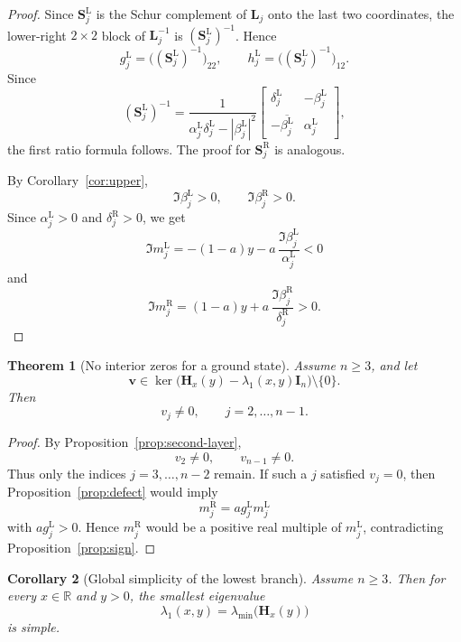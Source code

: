 \documentclass[11pt]{article}
\numberwithin{equation}{section}
\newtheorem{theorem}{Theorem}[section]
\newtheorem{corollary}[theorem]{Corollary}
\newcommand{\R}{\mathbb R}
\newcommand{\I}{\mathbf I}
\newcommand{\Hmat}{\mathbf H}
\begin{document}
\begin{proof}
Since \(\mathbf S_j^{\mathrm L}\) is the Schur complement of \(\mathbf L_j\) onto the last
two coordinates, the lower-right \(2\times2\) block of \(\mathbf L_j^{-1}\) is
\((\mathbf S_j^{\mathrm L})^{-1}\).  Hence
\[
g_j^{\mathrm L}=\bigl((\mathbf S_j^{\mathrm L})^{-1}\bigr)_{22},
\qquad
h_j^{\mathrm L}=\bigl((\mathbf S_j^{\mathrm L})^{-1}\bigr)_{12}.
\]
Since
\[
(\mathbf S_j^{\mathrm L})^{-1}
=
\frac{1}{\alpha_j^{\mathrm L}\delta_j^{\mathrm L}-|\beta_j^{\mathrm L}|^2}
\begin{bmatrix}
\delta_j^{\mathrm L} & -\beta_j^{\mathrm L}\\
-\overline{\beta_j^{\mathrm L}} & \alpha_j^{\mathrm L}
\end{bmatrix},
\]
the first ratio formula follows.  The proof for \(\mathbf S_j^{\mathrm R}\) is analogous.

By Corollary~\ref{cor:upper},
\[
\Im\beta_j^{\mathrm L}>0,
\qquad
\Im\beta_j^{\mathrm R}>0.
\]
Since \(\alpha_j^{\mathrm L}>0\) and \(\delta_j^{\mathrm R}>0\), we get
\[
\Im m_j^{\mathrm L}
=
-(1-a)y-a\,\frac{\Im\beta_j^{\mathrm L}}{\alpha_j^{\mathrm L}}<0
\]
and
\[
\Im m_j^{\mathrm R}
=
(1-a)y+a\,\frac{\Im\beta_j^{\mathrm R}}{\delta_j^{\mathrm R}}>0.
\]
\end{proof}

\begin{theorem}[No interior zeros for a ground state]\label{thm:nozero}
Assume \(n\ge3\), and let
\[
\bm v\in
\ker\bigl(\Hmat_x(y)-\lambda_1(x,y)\I_n\bigr)\setminus\{0\}.
\]
Then
\[
v_j\neq0,
\qquad
j=2,\dots,n-1.
\]
\end{theorem}

\begin{proof}
By Proposition~\ref{prop:second-layer},
\[
v_2\neq0,
\qquad
v_{n-1}\neq0.
\]
Thus only the indices \(j=3,\dots,n-2\) remain.  If such a \(j\) satisfied \(v_j=0\),
then Proposition~\ref{prop:defect} would imply
\[
m_j^{\mathrm R}=ag_j^{\mathrm L}m_j^{\mathrm L}
\]
with \(ag_j^{\mathrm L}>0\).  Hence \(m_j^{\mathrm R}\) would be a positive real multiple of
\(m_j^{\mathrm L}\), contradicting Proposition~\ref{prop:sign}.
\end{proof}

\begin{corollary}[Global simplicity of the lowest branch]\label{cor:simple}
Assume \(n\ge3\).  Then for every \(x\in\R\) and \(y>0\), the smallest eigenvalue
\[
\lambda_1(x,y)=\lambda_{\min}\!\bigl(\Hmat_x(y)\bigr)
\]
is simple.
\end{corollary}
\end{document}
